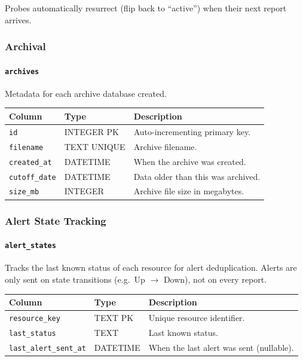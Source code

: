 \documentclass[12pt]{report}
\begin{document}
Probes automatically resurrect (flip back to ``active'') when their next
report arrives.

\subsubsection{Archival}

\paragraph{\texttt{archives}} Metadata for each archive database created.

\begin{longtable}{@{} l l p{6cm} @{}}
\toprule
\textbf{Column} & \textbf{Type} & \textbf{Description} \\
\midrule
\texttt{id} & INTEGER PK & Auto-incrementing primary key. \\
\texttt{filename} & TEXT UNIQUE & Archive filename. \\
\texttt{created\_at} & DATETIME & When the archive was created. \\
\texttt{cutoff\_date} & DATETIME & Data older than this was archived. \\
\texttt{size\_mb} & INTEGER & Archive file size in megabytes. \\
\bottomrule
\end{longtable}

\subsubsection{Alert State Tracking}

\paragraph{\texttt{alert\_states}} Tracks the last known status of each
resource for alert deduplication. Alerts are only sent on state transitions
(e.g.\ Up $\to$ Down), not on every report.

\begin{longtable}{@{} l l p{6cm} @{}}
\toprule
\textbf{Column} & \textbf{Type} & \textbf{Description} \\
\midrule
\texttt{resource\_key} & TEXT PK & Unique resource identifier. \\
\texttt{last\_status} & TEXT & Last known status. \\
\texttt{last\_alert\_sent\_at} & DATETIME & When the last alert was sent
    (nullable). \\
\bottomrule
\end{longtable}
\end{document}
